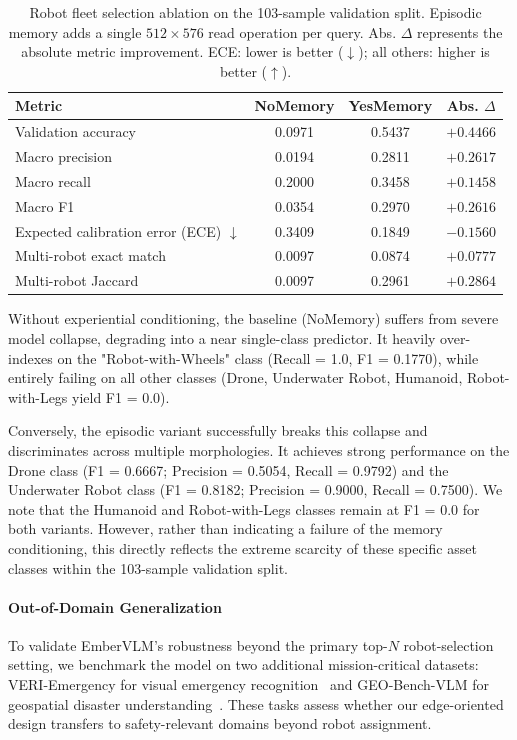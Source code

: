 \documentclass[runningheads]{llncs}
\begin{document}
\begin{table}[t]
\centering
\caption{Robot fleet selection ablation on the 103-sample validation split. Episodic memory adds a single $512 \times 576$ read operation per query. Abs. $\Delta$ represents the absolute metric improvement. ECE: lower is better ($\downarrow$); all others: higher is better ($\uparrow$).}
\label{tab:robot_selection}
\begin{tabular}{lccc}
\toprule
\textbf{Metric} & \textbf{NoMemory} & \textbf{YesMemory} & \textbf{Abs. $\Delta$} \\
\midrule
Validation accuracy & 0.0971 & 0.5437 & $+0.4466$ \\
Macro precision & 0.0194 & 0.2811 & $+0.2617$ \\
Macro recall & 0.2000 & 0.3458 & $+0.1458$ \\
Macro F1 & 0.0354 & 0.2970 & $+0.2616$ \\
Expected calibration error (ECE) $\downarrow$ & 0.3409 & 0.1849 & $-0.1560$ \\
Multi-robot exact match & 0.0097 & 0.0874 & $+0.0777$ \\
Multi-robot Jaccard & 0.0097 & 0.2961 & $+0.2864$ \\
\bottomrule
\end{tabular}
\end{table}

Without experiential conditioning, the baseline (NoMemory) suffers from severe model collapse, degrading into a near single-class predictor. It heavily over-indexes on the "Robot-with-Wheels" class (Recall = 1.0, F1 = 0.1770), while entirely failing on all other classes (Drone, Underwater Robot, Humanoid, Robot-with-Legs yield F1 = 0.0). 

Conversely, the episodic variant successfully breaks this collapse and discriminates across multiple morphologies. It achieves strong performance on the Drone class (F1 = 0.6667; Precision = 0.5054, Recall = 0.9792) and the Underwater Robot class (F1 = 0.8182; Precision = 0.9000, Recall = 0.7500). We note that the Humanoid and Robot-with-Legs classes remain at F1 = 0.0 for both variants. However, rather than indicating a failure of the memory conditioning, this directly reflects the extreme scarcity of these specific asset classes within the 103-sample validation split.

\paragraph{Out-of-Domain Generalization}
To validate EmberVLM's robustness beyond the primary top-$N$ robot-selection setting, we benchmark the model on two additional mission-critical datasets: VERI-Emergency for visual emergency recognition~\cite{choi2026better} and GEO-Bench-VLM for geospatial disaster understanding~\cite{danish2025geobench}. These tasks assess whether our edge-oriented design transfers to safety-relevant domains beyond robot assignment.
\end{document}
